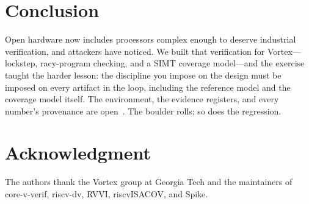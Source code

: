 \documentclass[conference]{IEEEtran}
\begin{document}
\section{Conclusion}
Open hardware now includes processors complex enough to deserve
industrial verification, and attackers have noticed. We built that
verification for Vortex---lockstep, racy-program checking, and a
SIMT coverage model---and the exercise taught the harder lesson:
the discipline you impose on the design must be imposed on every
artifact in the loop, including the reference model and the coverage
model itself. The environment, the evidence registers, and every
number's provenance are open~\cite{preprint}. The boulder rolls; so
does the regression.

\section*{Acknowledgment}
The authors thank the Vortex group at Georgia Tech and the
maintainers of core-v-verif, riscv-dv, RVVI, riscvISACOV, and Spike.
\end{document}
